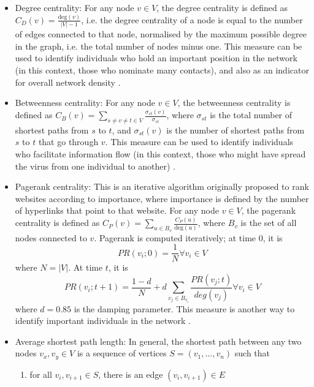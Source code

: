 \begin{itemize}
	\item Degree centrality: For any node $v \in V$, the degree centrality is defined as $C_D(v) = \frac{\text{deg}(v)}{\lvert V \rvert - 1}$, i.e. the degree centrality of a node is equal to the number of edges connected to that node, normalised by the maximum possible degree in the graph, i.e. the total number of nodes minus one. This measure can be used to identify individuals who hold an important position in the network (in this context, those who nominate many contacts), and also as an indicator for overall network density \cite{golbeck}.
	\item Betweenness centrality: For any node $v \in V$, the betweenness centrality is defined as $C_B(v) = \sum_{s\neq v\neq t\in V}\frac{\sigma_{st}(v)}{\sigma_{st}}$, where $\sigma_{st}$ is the total number of shortest paths from $s$ to $t$, and $\sigma_{st}(v)$ is the number of shortest paths from $s$ to $t$ that go through $v$. This measure can be used to identify individuals who facilitate information flow (in this context, those who might have spread the virus from one individual to another) \cite{golbeck}.
	\item Pagerank centrality: This is an iterative algorithm originally proposed to rank websites according to importance, where importance is defined by the number of hyperlinks that point to that website. For any node $v \in V$, the pagerank centrality is defined as $C_P(v) = \sum_{u \in B_v}\frac{C_P(u)}{\text{deg}(u)}$, where $B_v$ is the set of all nodes connected to $v$. Pagerank is computed iteratively; at time 0, it is
	\begin{equation*}
		PR(v_i;0) = \frac{1}{N} \forall v_i \in V
	\end{equation*}
	where $N = \lvert V \rvert$. At time $t$, it is
	\begin{equation*}
		PR(v_i;t+1) = \frac{1 - d}{N} + d \sum_{v_j \in B_{v_i}} \frac{PR(v_j;t)}{deg(v_j)} \forall v_i \in V
	\end{equation*}
	where $d = 0.85$ is the damping parameter. This measure is another way to identify important individuals in the network \cite{gleich_pagerank}.
	\item Average shortest path length: In general, the shortest path between any two nodes $v_x,v_y \in V$ is a sequence of vertices $S = (v_1,...,v_n)$ such that 
	\begin{enumerate}
		\item for all $v_i,v_{i+1} \in S$, there is an edge $(v_i,v_{i+1}) \in E$

\end{enumerate}
\end{itemize}
